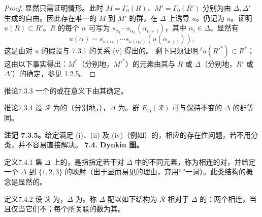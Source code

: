 \begin{proof}
显然只需证明情形。此时 $M=\Gamma_0(R)$、$M'=\Gamma_0(R')$ 分别为由 $\Delta,\Delta'$ 生成的自由。因此存在唯一的 $M$ 到 $M'$ 的群，在 $\Delta$ 上诱导 $u$。仍记为 $u$。证明 $u(R)\subset R'$。$R$ 的每个 $\alpha$ 可写为 $s_{\alpha_1}\cdots s_{\alpha_n}(\alpha_{n+1})$，其中 $\alpha_i\in\Delta$。显然有
\[u(\alpha)=s_{u(\alpha_1)}\cdots s_{u(\alpha_n)}(u(\alpha_{n+1})),\]
这是由对 $u$ 的假设与 7.3.1 的关系 (v) 得出的。
剩下只须证明 ${}^tu(R'^*)\subset R^*$；这由以下事实得出：$M^*$（分别地，$M'^*$）的元素由其与 $R$ 或 $\Delta$（分别地，$R'$ 或 $\Delta'$）的确定，参见 1.2.5。
\end{proof}
\begin{SGAresult}{推论}{7.3.3}
一个的或在意义下由其确定。
\end{SGAresult}
\begin{SGAresult}{推论}{7.3.4}
设 $\mathscr R$ 为的（分别地，），$\Delta$ 为。群 $E_\Delta(\mathscr R)$ 可与保持不变的 $\Delta$ 的群等同。
\end{SGAresult}
\textbf{注记 7.3.5。}给定满足 (i)、(ii) 及 (iv)（例如）的，相应的存在性问题，若不用分类，并不容易直接解决。
\textbf{7.4. Dynkin 图。}
\begin{SGAresult}{定义}{7.4.1}
集 $\Delta$ 上的，是指指定若干对 $\Delta$ 中的不同元素，称为相连的对，并给定一个 $\Delta$ 到 $\{1,2,3\}$ 的映射（出于显而易见的理由，弃用“”一词）。此类结构的概念是显然的。
\end{SGAresult}
\begin{SGAresult}{定义}{7.4.2}
设 $\mathscr R$ 为，$\Delta$ 为。称 $\Delta$ 配以如下结构为 $\mathscr R$ 相对于 $\Delta$ 的：两个相连，当且仅当它们不；每个所关联的数为其。
\end{SGAresult}

